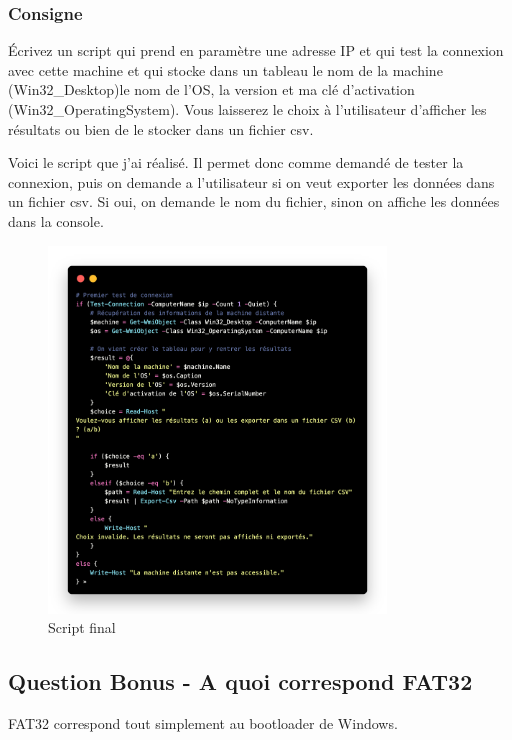 \documentclass[12pt, a4paper]{article}
\begin{document}
\subsubsection{Consigne}
Écrivez un script qui prend en paramètre une adresse IP et qui test la 
connexion avec cette machine et qui stocke dans un tableau le nom de la 
machine (Win32\_Desktop)le nom de l’OS, la version et ma clé d’activation 
(Win32\_OperatingSystem). Vous laisserez le choix à l’utilisateur d’afficher 
les résultats ou bien de le stocker dans un fichier csv.

Voici le script que j'ai réalisé. Il permet donc comme demandé de tester la 
connexion, puis on demande a l'utilisateur si on veut exporter les données
dans un fichier csv. Si oui, on demande le nom du fichier, sinon on affiche
les données dans la console.\\

\begin{figure}[h]
    \centering
    \includegraphics[width=0.8\textwidth]{img/code5.png}
    \caption{Script final}
    \label{fig:script-final}
\end{figure}



\subsection{Question Bonus - A quoi correspond FAT32}
FAT32 correspond tout simplement au bootloader de Windows.
\end{document}
